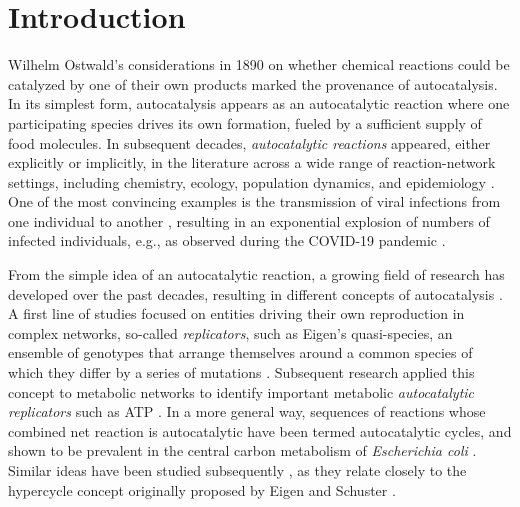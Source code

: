 \documentclass[pdflatex]{sn-jnl}
\theoremstyle{thmstyleone}%
\theoremstyle{examplesty}%
\theoremstyle{thmstylethree}%
\newcommand{\NV}[1]{\begingroup\color{teal}#1\endgroup}
\begin{document}






\maketitle


\section{Introduction}

Wilhelm Ostwald's considerations in 1890 on whether chemical reactions
could be catalyzed by one of their own products \cite{Ostwald:90} marked
the provenance of autocatalysis. In its simplest form, \NV{a}utocatalysis
appears as an autocatalytic reaction where one participating species drives
its own formation, fueled by a sufficient supply of food molecules. In
subsequent decades, \emph{autocatalytic reactions} appeared, either
explicitly or implicitly, in the literature across a wide range of
reaction-network settings, including chemistry, ecology, population
dynamics, and epidemiology \cite{lotka_contribution_1910,
  lotka_analytical_1920, lotka1925elements, volterra1926variazioni,
  kermack_contributions_1991}. One of the most convincing examples is the
transmission of viral infections from one individual to another
\cite{kermack_contributions_1991}, resulting in an exponential explosion of
numbers of infected individuals, e.g., as observed during the COVID-19
pandemic \cite{saxena_propagation_2021}.

From the simple idea of an autocatalytic reaction, a growing field of
research has developed over the past decades, resulting in different
concepts of autocatalysis \cite{andersen_defining_2021}.  A first line of
studies focused on entities driving their own reproduction in complex
networks, so-called \emph{replicators}, such as Eigen's quasi-species, an
ensemble of genotypes that arrange themselves around a common species of
which they differ by a series of mutations
\cite{eigen_selforganization_1971}.  Subsequent research applied this
concept to metabolic networks to identify important metabolic
\emph{autocatalytic replicators} such as ATP
\cite{kun_computational_2008}. In a more general way, sequences of
reactions whose combined net reaction is autocatalytic have been termed
autocatalytic cycles, and shown to be prevalent in the central carbon
metabolism of \emph{Escherichia coli} \cite{barenholz_design_2017,
  smith_universality_2004}. Similar ideas have been studied subsequently
\cite{joshi_autocatalytic_2021}, as they relate closely to the hypercycle
concept originally proposed by Eigen and Schuster
\cite{eigen_principle_1977}.
\end{document}
